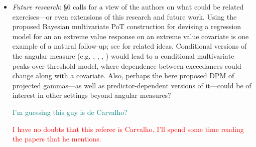 \documentclass[10pt]{article}
\newcommand{\comment}[1]{\textcolor{teal}{#1}}
\newcommand{\bruno}[1]{\textcolor{red}{#1}}
\begin{document}
\begin{itemize}
\item \emph{Future research}: §6 calls for a view of the authors on what 
    could be related exercises—or even extensions of this research and future 
    work. Using the proposed Bayesian multivariate PoT construction for 
    devising a regression model for an an extreme value response on an extreme 
    value covariate is one example of a natural follow-up; see 
    \cite{carvalho2022} for related ideas. Conditional versions of the angular 
    measure (e.g. \cite{carvalho2016}, \cite{castro2018}, \cite{escobar2018}, 
    \cite{mhalla2019}) would lead to a conditional multivariate 
    peaks-over-threshold model, where dependence between exceedances could 
    change along with a covariate. Also, perhaps the here proposed DPM of 
    projected gammas—as well as predictor-dependent versions of it—could be of 
    interest in other settings beyond angular measures?

    \comment{I'm guessing this guy is de Carvalho?}
    
    \bruno{I have no doubts that this referee is Carvalho. I'll spend some time 
    reading the papers that he mentions.}
    
\end{itemize}
\end{document}
